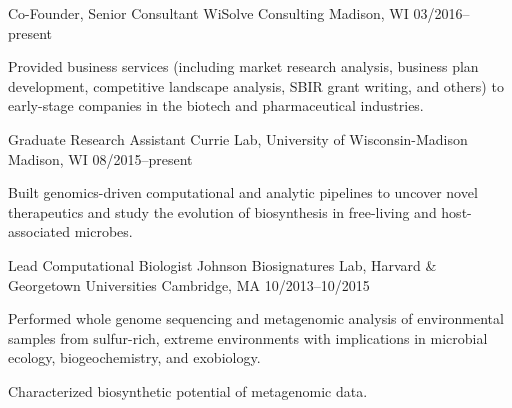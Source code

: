 

\begin{cventries}

  \cventry
    {Co-Founder, Senior Consultant} %
    {WiSolve Consulting} %
    {Madison, WI} %
    {03/2016--present} %
    {
      \begin{cvitems} %
        \item {Provided business services (including market research analysis, business plan development, competitive landscape analysis, SBIR grant writing, and others) to early-stage companies in the biotech and pharmaceutical industries.}
      \end{cvitems}
    }

  \cventry
    {Graduate Research Assistant} %
    {Currie Lab, University of Wisconsin-Madison} %
    {Madison, WI} %
    {08/2015--present} %
    {
      \begin{cvitems} %
        \item {Built genomics-driven computational and analytic pipelines to uncover novel therapeutics and study the evolution of biosynthesis in free-living and host-associated microbes.}
      \end{cvitems}
    }

  \cventry
    {Lead Computational Biologist} %
    {Johnson Biosignatures Lab, Harvard \& Georgetown Universities} %
    {Cambridge, MA} %
    {10/2013--10/2015} %
    {
      \begin{cvitems} %
        \item {Performed whole genome sequencing and metagenomic analysis of environmental samples from sulfur-rich, extreme environments with implications in microbial ecology, biogeochemistry, and exobiology.}
        \item {Characterized biosynthetic potential of metagenomic data.}
      \end{cvitems} 
    }
    

\end{cventries}
